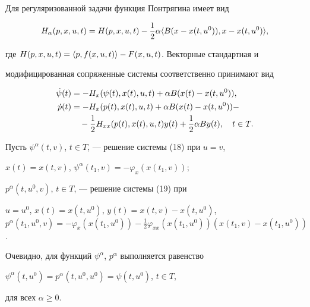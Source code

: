  


Для регуляризованной задачи функция Понтрягина имеет вид 


$$ 


H_\alpha(p,x,u,t)=H(p,x,u,t)-\frac{1}{2}\alpha\la 


B(x-x(t,u^0)),x-x(t,u^0)\ra, 


$$ 


где $H(p,x,u,t)=\langle p,f(x,u,t)\rangle-F(x,u,t)$. Векторные стандартная и 


модифицированная сопряженные системы соответственно принимают вид 


\begin{align} 


\Dot\psi(t)&=-H_x(\psi(t),x(t),u,t)+\alpha B(x(t)- 


x(t,u^0)), \\ 


% 


\Dot p(t)&=-H_x(p(t),x(t),u,t)+\alpha B(x(t)- 


x(t,u^0)) - \notag \\ 


% 


&\quad -\frac{1}{2}H_{xx}(p(t),x(t),u,t)y(t)+\frac{1}{2} 


\alpha B y(t),\quad t\in T. 


\end{align} 


 


Пусть $\psi^\alpha(t,v)$, $t\in T$, --- решение системы (18) при $u=v$, 


$x(t)=x(t,v)$, $\psi^\alpha(t_1,v)=-\varphi_x(x(t_1,v))$; 


$p^\alpha(t,u^0,v)$, $t\in T$, --- решение системы (19) при 


$u=u^0$, $x(t)=x(t,u^0)$, $y(t)=x(t,v)-x(t,u^0)$, $p^\alpha(t_1,u^0,v)= 


-\varphi_x(x(t_1,u^0))-\frac{1}{2}\varphi_{xx} 


(x(t_1,u^0))(x(t_1,v)-x(t_1,u^0))$. 


 


Очевидно, для функций $\psi^\alpha$, $p^\alpha$ выполняется равенство 


$\psi^\alpha(t,u^0)=p^\alpha(t,u^0,u^0)=\psi(t,u^0)$, $t\in T$, 


для всех $\alpha\ge0$. 


 


